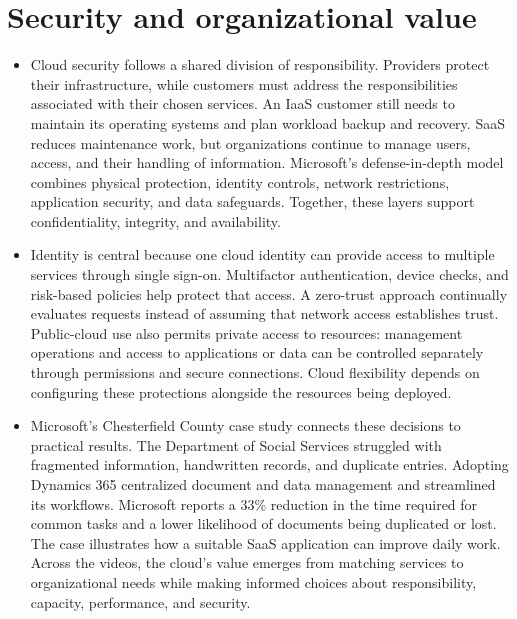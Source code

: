 \documentclass[10pt]{article}
\begin{document}
\section*{Security and organizational value}

\begin{itemize}[leftmargin=1.25em, itemsep=0.3em, parsep=0pt, topsep=0pt]
    \item Cloud security follows a shared division of responsibility. Providers protect their infrastructure, while customers must address the responsibilities associated with their chosen services. An IaaS customer still needs to maintain its operating systems and plan workload backup and recovery. SaaS reduces maintenance work, but organizations continue to manage users, access, and their handling of information. Microsoft's defense-in-depth model combines physical protection, identity controls, network restrictions, application security, and data safeguards. Together, these layers support confidentiality, integrity, and availability.

    \item Identity is central because one cloud identity can provide access to multiple services through single sign-on. Multifactor authentication, device checks, and risk-based policies help protect that access. A zero-trust approach continually evaluates requests instead of assuming that network access establishes trust. Public-cloud use also permits private access to resources: management operations and access to applications or data can be controlled separately through permissions and secure connections. Cloud flexibility depends on configuring these protections alongside the resources being deployed.

    \item Microsoft's Chesterfield County case study connects these decisions to practical results. The Department of Social Services struggled with fragmented information, handwritten records, and duplicate entries. Adopting Dynamics 365 centralized document and data management and streamlined its workflows. Microsoft reports a 33\% reduction in the time required for common tasks and a lower likelihood of documents being duplicated or lost. The case illustrates how a suitable SaaS application can improve daily work. Across the videos, the cloud's value emerges from matching services to organizational needs while making informed choices about responsibility, capacity, performance, and security.
\end{itemize}

\end{document}
